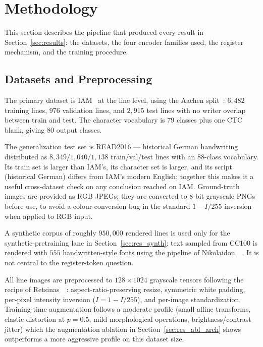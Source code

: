 \section{Methodology}
\label{sec:methodology}

This section describes the pipeline that produced every result in Section~\ref{sec:results}: the datasets, the four encoder families used, the register mechanism, and the training procedure.

\subsection{Datasets and Preprocessing}
\label{sec:datasets}

The primary dataset is IAM~\cite{marti2002iam} at the line level, using the Aachen split~\cite{retsinas2022htrbestpractices}: $6{,}482$ training lines, $976$ validation lines, and $2{,}915$ test lines with no writer overlap between train and test. The character vocabulary is $79$ classes plus one CTC blank, giving $80$ output classes.

The generalization test set is READ2016 --- historical German handwriting distributed as $8{,}349/1{,}040/1{,}138$ train/val/test lines with an $88$-class vocabulary. Its train set is larger than IAM's, its character set is larger, and its script (historical German) differs from IAM's modern English; together this makes it a useful cross-dataset check on any conclusion reached on IAM. Ground-truth images are provided as RGB JPEGs; they are converted to 8-bit grayscale PNGs before use, to avoid a colour-conversion bug in the standard $1 - I/255$ inversion when applied to RGB input.

A synthetic corpus of roughly $950{,}000$ rendered lines is used only for the synthetic-pretraining lane in Section~\ref{sec:res_synth}: text sampled from CC100 is rendered with $555$ handwritten-style fonts using the pipeline of Nikolaidou~\etal~\cite{nikolaidou2023wordstylist}. It is not central to the register-token question.

All line images are preprocessed to $128 \times 1024$ grayscale tensors following the recipe of Retsinas~\etal~\cite{retsinas2022htrbestpractices}: aspect-ratio-preserving resize, symmetric white padding, per-pixel intensity inversion ($\hat I = 1 - I/255$), and per-image standardization. Training-time augmentation follows a moderate profile (small affine transforms, elastic distortion at $p{=}0.5$, mild morphological operations, brightness/contrast jitter) which the augmentation ablation in Section~\ref{sec:res_abl_arch} shows outperforms a more aggressive profile on this dataset size.

